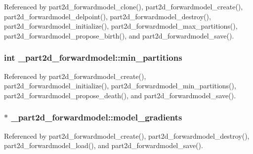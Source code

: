 Referenced by part2d\+\_\+forwardmodel\+\_\+clone(), part2d\+\_\+forwardmodel\+\_\+create(), part2d\+\_\+forwardmodel\+\_\+delpoint(), part2d\+\_\+forwardmodel\+\_\+destroy(), part2d\+\_\+forwardmodel\+\_\+initialize(), part2d\+\_\+forwardmodel\+\_\+max\+\_\+partitions(), part2d\+\_\+forwardmodel\+\_\+propose\+\_\+birth(), and part2d\+\_\+forwardmodel\+\_\+save().

\subsubsection[{\texorpdfstring{min\+\_\+partitions}{min_partitions}}]{\setlength{\rightskip}{0pt plus 5cm}int \+\_\+part2d\+\_\+forwardmodel\+::min\+\_\+partitions}\hypertarget{struct__part2d__forwardmodel_a01d81ff50583385c1b8eb54fd7948ca7}{}\label{struct__part2d__forwardmodel_a01d81ff50583385c1b8eb54fd7948ca7}


Referenced by part2d\+\_\+forwardmodel\+\_\+create(), part2d\+\_\+forwardmodel\+\_\+initialize(), part2d\+\_\+forwardmodel\+\_\+min\+\_\+partitions(), part2d\+\_\+forwardmodel\+\_\+propose\+\_\+death(), and part2d\+\_\+forwardmodel\+\_\+save().

\subsubsection[{\texorpdfstring{model\+\_\+gradients}{model_gradients}}]{$\ast$ \+\_\+part2d\+\_\+forwardmodel\+::model\+\_\+gradients}\hypertarget{struct__part2d__forwardmodel_ad88ddfb2d4f6c66d47043b3ca4fa6f2c}{}\label{struct__part2d__forwardmodel_ad88ddfb2d4f6c66d47043b3ca4fa6f2c}


Referenced by part2d\+\_\+forwardmodel\+\_\+create(), part2d\+\_\+forwardmodel\+\_\+destroy(), part2d\+\_\+forwardmodel\+\_\+load(), and part2d\+\_\+forwardmodel\+\_\+save().

